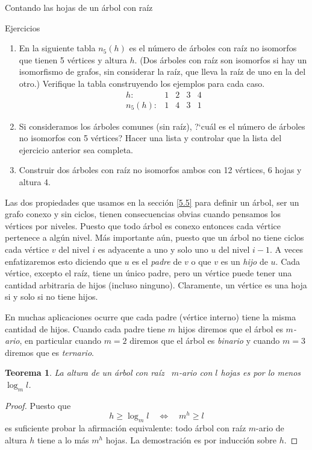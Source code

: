 \documentclass[11pt,spanish,makeidx]{amsbook}
\newtheorem{teorema}{Teorema}[section]
\theoremstyle{definition}
\theoremstyle{remark}
\begin{document}
\begin{section}{Contando las hojas de un árbol con raíz}
\begin{subsection}{Ejercicios}\label{ejercicios6.1}
\begin{enumerate}
\item En la siguiente tabla $n_5(h)$ es el número de árboles con raíz no isomorfos que tienen 5 vértices y altura $h$. (Dos árboles con raíz son isomorfos si hay un isomorfismo de grafos, sin considerar la raíz, que lleva la raíz de uno en la del otro.) Verifique la tabla construyendo los ejemplos para cada caso. $$
\begin{matrix}
h: &1 &2 &3 &4 \\
n_5(h): &1 &4 & 3 &1
\end{matrix}
$$
\item Si consideramos los árboles comunes (sin raíz), ?`cuál es el número de árboles no isomorfos con 5 vértices? Hacer una lista y controlar que la lista del ejercicio anterior sea completa.
\item Construir dos árboles con raíz no isomorfos ambos con 12 vértices, 6 hojas y altura 4.
\end{enumerate}
\end{subsection}

Las dos propiedades que usamos en la sección \ref{5.5} para definir un árbol, ser un grafo conexo y sin ciclos, tienen consecuencias obvias cuando pensamos los vértices por niveles. Puesto que todo árbol es conexo entonces cada vértice pertenece a algún nivel. Más importante aún, puesto que un árbol no tiene ciclos  cada vértice $v$ del nivel $i$ es adyacente a uno y solo uno $u$ del nivel $i-1$. A veces enfatizaremos esto diciendo que $u$ es el {\it {padre}} de $v$ o que $v$ es un {\it {hijo}} de $u$. Cada    vértice, excepto el raíz, tiene un único padre, pero un vértice puede tener una cantidad arbitraria de hijos (incluso ninguno). Claramente, un vértice es una hoja si y solo si no tiene hijos.

En muchas aplicaciones ocurre que cada padre (vértice interno) tiene la misma cantidad de hijos. Cuando cada padre tiene $m$ hijos diremos que el árbol es {\em $m$-ario}, en particular cuando $m=2$ diremos que el árbol es {\it binario}     y cuando $m=3$ diremos que es {\it ternario}.

\begin{teorema}\label{t6.1} La altura de un árbol con raíz\,\,\, $m$-ario con $l$ hojas es por lo menos $\log_ml$.
\end{teorema}
\begin{proof} Puesto que
$$
h \ge \log_ml \quad \Leftrightarrow \quad m^h \ge l
$$
es suficiente probar la afirmación equivalente: todo árbol con raíz $m$-ario de altura $h$ tiene a lo más $m^h$ hojas. La demostración es por inducción sobre $h$.


\end{proof}
\end{section}
\end{document}
